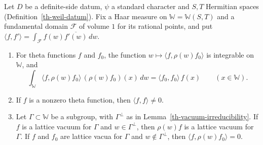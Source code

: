 \begin{lemma}\label{th-lattice-vacua}
Let $D$ be a definite-side datum, $\psi$ a standard character and $S,T$
Hermitian spaces (Definition~\ref{th-weil-datum}). Fix a Haar measure on
$\mathbb W=\mathbb W(S,T)$ and a fundamental domain $\mathcal F$ of volume $1$
for its rational points, and put
$\langle f,f'\rangle=\int_{\mathcal F}f(w)\overline{f'(w)}\,dw$.
\begin{enumerate}
\item For theta functions $f$ and $f_0$, the function
  $w\mapsto\langle f,\rho(w)f_0\rangle$ is integrable on $\mathbb W$, and
  \[
  \int_{\mathbb W}\langle f,\rho(w)f_0\rangle\,(\rho(w)f_0)(x)\,dw=\langle f_0,f_0\rangle\,f(x)
  \qquad(x\in\mathbb W).
  \]
\item If $f$ is a nonzero theta function, then $\langle f,f\rangle\neq0$.
\item Let $\Gamma\subset\mathbb W$ be a subgroup, with $\Gamma^\perp$ as in
  Lemma~\ref{th-vacuum-irreducibility}. If $f$ is a lattice vacuum for $\Gamma$
  and $w\in\Gamma^\perp$, then $\rho(w)f$ is a lattice vacuum for $\Gamma$. If
  $f$ and $f_0$ are lattice vacua for $\Gamma$ and $w\notin\Gamma^\perp$, then
  $\langle f,\rho(w)f_0\rangle=0$.
\end{enumerate}
\end{lemma}
